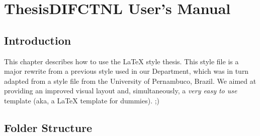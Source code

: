 % 
%  
%
\chapter{ThesisDIFCTNL User's Manual}
\label{cha:users_manual}

\section{Introduction} %
\label{sec:introduction}

This chapter describes how to use the \LaTeX{} style thesis{}. This style file is a major rewrite from a previous style used in our Department, which was in turn adapted from a style file from the University of Pernambuco, Brazil.  We aimed at providing an improved visual layout and, simultaneously, a \emph{very easy to use} template (aka, a \LaTeX{} template for dummies). ;)

\noindent%

\section{Folder Structure} %
\label{sec:folder_structure}

